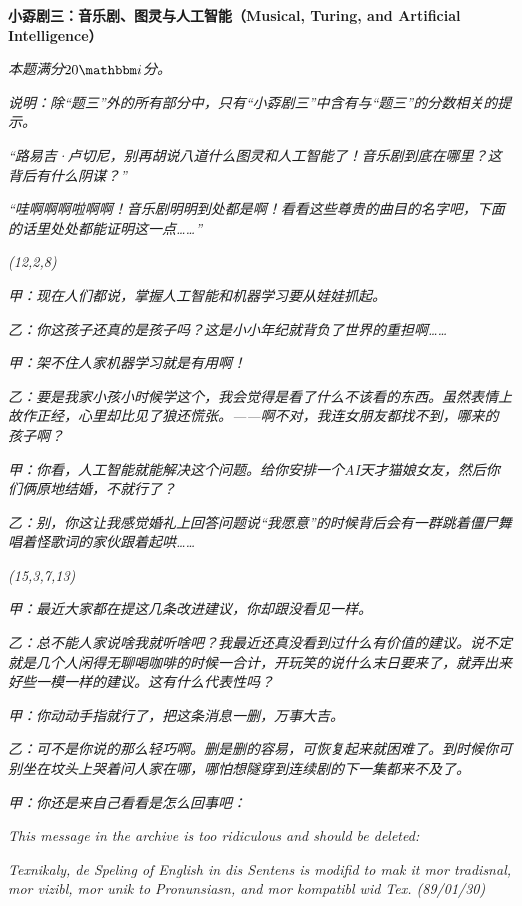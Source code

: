 \documentclass[11pt,a4paper,onecolumn,UTF8]{ctexart}
\begin{document}
	
	\newpage
	\noindent
	\textbf{小孬剧三：音乐剧、图灵与人工智能（Musical, Turing, and Artificial Intelligence）}
	
	\textit{本题满分$20\ui$分。}
	
	\textit{说明：除“题三”外的所有部分中，只有“小孬剧三”中含有与“题三”的分数相关的提示。}
	
	\textit{“路易吉·卢切尼，别再胡说八道什么图灵和人工智能了！音乐剧到底在哪里？这背后有什么阴谋？”}
	
	\textit{“哇啊啊啊啦啊啊！音乐剧明明到处都是啊！看看这些尊贵的曲目的名字吧，下面的话里处处都能证明这一点……”}
	
	\textit{(12,2,8)}
	
	\textit{甲：现在人们都说，掌握人工智能和机器学习要从娃娃抓起。}
	
	\textit{乙：你这孩子还真的是孩子吗？这是小小年纪就背负了世界的重担啊……}
	
	\textit{甲：架不住人家机器学习就是有用啊！}
	
	\textit{乙：要是我家小孩小时候学这个，我会觉得是看了什么不该看的东西。虽然表情上故作正经，心里却比见了狼还慌张。——啊不对，我连女朋友都找不到，哪来的孩子啊？}
	
	\textit{甲：你看，人工智能就能解决这个问题。给你安排一个AI天才猫娘女友，然后你们俩原地结婚，不就行了？}
	
	\textit{乙：别，你这让我感觉婚礼上回答问题说“我愿意”的时候背后会有一群跳着僵尸舞唱着怪歌词的家伙跟着起哄……}
	
	\textit{(15,3,7,13)}
	
	\textit{甲：最近大家都在提这几条改进建议，你却跟没看见一样。}
	
	\textit{乙：总不能人家说啥我就听啥吧？我最近还真没看到过什么有价值的建议。说不定就是几个人闲得无聊喝咖啡的时候一合计，开玩笑的说什么末日要来了，就弄出来好些一模一样的建议。这有什么代表性吗？}
	
	\textit{甲：你动动手指就行了，把这条消息一删，万事大吉。}
	
	\textit{乙：可不是你说的那么轻巧啊。删是删的容易，可恢复起来就困难了。到时候你可别坐在坟头上哭着问人家在哪，哪怕想隧穿到连续剧的下一集都来不及了。}
	
	\textit{甲：你还是来自己看看是怎么回事吧：}
	
	\textit{This message in the archive is too ridiculous and should be deleted:}
	
	\textit{Texnikaly, de Speling of English in dis Sentens is modifid to mak it mor tradisnal, mor vizibl, mor unik to Pronunsiasn, and mor kompatibl wid Tex. (89/01/30)}
	
\end{document}
